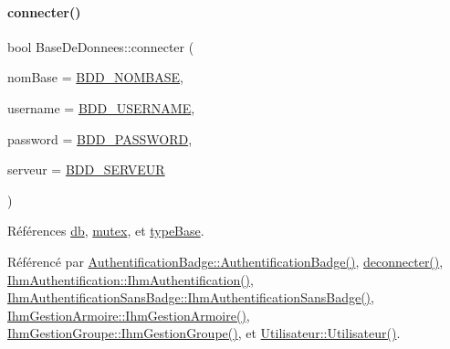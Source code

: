\paragraph{\texorpdfstring{connecter()}{connecter()}\hspace{0.1cm}{\footnotesize\ttfamily [1/2]}}
{\footnotesize\ttfamily bool Base\+De\+Donnees\+::connecter (\begin{DoxyParamCaption}\item[{Q\+String}]{nom\+Base = {\ttfamily \hyperlink{e-stock_8h_a45f8f15b8f9a7ab4c2b219038ff64f6b}{B\+D\+D\+\_\+\+N\+O\+M\+B\+A\+SE}},  }\item[{Q\+String}]{username = {\ttfamily \hyperlink{e-stock_8h_a88b5f5b81fa534553c68802384beff2c}{B\+D\+D\+\_\+\+U\+S\+E\+R\+N\+A\+ME}},  }\item[{Q\+String}]{password = {\ttfamily \hyperlink{e-stock_8h_ae2ded9166ed2553182545e97514c04f7}{B\+D\+D\+\_\+\+P\+A\+S\+S\+W\+O\+RD}},  }\item[{Q\+String}]{serveur = {\ttfamily \hyperlink{e-stock_8h_a423559dc987673b8aacaa9f369839bb0}{B\+D\+D\+\_\+\+S\+E\+R\+V\+E\+UR}} }\end{DoxyParamCaption})}



Références \hyperlink{class_base_de_donnees_a3e738dcf443370c46a541677ab619f06}{db}, \hyperlink{class_base_de_donnees_aa1b4696fac87a740f914aa73739086f2}{mutex}, et \hyperlink{class_base_de_donnees_ab682b82167f494496a6531bfe522b42b}{type\+Base}.



Référencé par \hyperlink{class_authentification_badge_a6c27fe0dc2a4a20fec1e75da5b400146}{Authentification\+Badge\+::\+Authentification\+Badge()}, \hyperlink{class_base_de_donnees_ae780999d25a26a0e4dbe0706a4785978}{deconnecter()}, \hyperlink{class_ihm_authentification_a09e60cbdf8d1377e17d940463acb75ba}{Ihm\+Authentification\+::\+Ihm\+Authentification()}, \hyperlink{class_ihm_authentification_sans_badge_aace6d9eebcab9fee429fe9dbb6840f15}{Ihm\+Authentification\+Sans\+Badge\+::\+Ihm\+Authentification\+Sans\+Badge()}, \hyperlink{class_ihm_gestion_armoire_a7aa5e1514dd5d1b5648a2f6dd36970f9}{Ihm\+Gestion\+Armoire\+::\+Ihm\+Gestion\+Armoire()}, \hyperlink{class_ihm_gestion_groupe_a27632f9cf5b66f4403c3534ee0e0ad18}{Ihm\+Gestion\+Groupe\+::\+Ihm\+Gestion\+Groupe()}, et \hyperlink{class_utilisateur_ae76433a6d353c5f5ad0c6a6af64022ad}{Utilisateur\+::\+Utilisateur()}.


